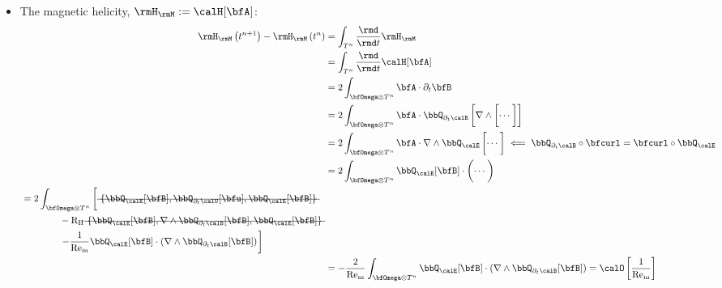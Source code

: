 \begin{itemize}
        \item  The magnetic helicity, $\rmH_{\rmM}  :=  \calH[\bfA]$:
        \begin{align}
                \rmH_{\rmM}\left(t^{n + 1}\right) - \rmH_{\rmM}\left(t^{n}\right)
                &=  \int_{T^{n}}\frac{\rmd}{\rmd t}\rmH_{\rmM}  \\
                &=  \int_{T^{n}}\frac{\rmd}{\rmd t}\calH[\bfA]  \\
                &=  2\int_{\bfOmega\otimes T^{n}}\bfA\cdot\partial_{t}\bfB  \\
                &=  2\int_{\bfOmega\otimes T^{n}}\bfA\cdot\bbQ_{\partial_{t}\calB}\left[\nabla\wedge\left[\cdots\tall\right]\right]  \\
                &=  2\int_{\bfOmega\otimes T^{n}}\bfA\cdot\nabla\wedge\bbQ_{\calE}\left[\cdots\tall\right]  \impliedby  \bbQ_{\partial_{t}\calB}\circ\bfcurl = \bfcurl\circ\bbQ_{\calE}  \\
                &=  2\int_{\bfOmega\otimes T^{n}}\bbQ_{\calE}[\bfB]\cdot\left(\cdots\tall\right)  \\
            \begin{split}
                &=  2\int_{\bfOmega\otimes T^{n}}\left[\mst{\{\bbQ_{\calE}[\bfB], \bbQ_{\partial_{t}\calU}[\bfu], \bbQ_{\calE}[\bfB]\}}\tall\right.  \\
                &\qquad\qquad- \rmRH\mst{\{\bbQ_{\calE}[\bfB], \nabla\wedge\bbQ_{\partial_{t}\calB}[\bfB], \bbQ_{\calE}[\bfB]\}}  \\
                &\qquad\qquad\left.- \frac{1}{\rmRem}\bbQ_{\calE}[\bfB]\cdot(\nabla\wedge\bbQ_{\partial_{t}\calB}[\bfB])\tall\right]
            \end{split}  \\
                &=  - \frac{2}{\rmRem}\int_{\bfOmega\otimes T^{n}}\bbQ_{\calE}[\bfB]\cdot(\nabla\wedge\bbQ_{\partial_{t}\calB}[\bfB])  =  \calO\left[\frac{1}{\rmRem}\right]
        \end{align}
    \end{itemize}
    
    \shortline

